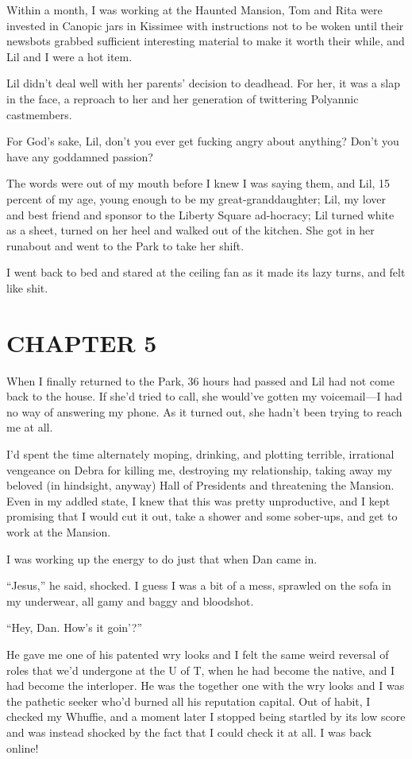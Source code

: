 Within a month, I was working at the Haunted Mansion, Tom and Rita
were invested in Canopic jars in Kissimee with instructions not to
be woken until their newsbots grabbed sufficient interesting
material to make it worth their while, and Lil and I were a hot
item.

Lil didn't deal well with her parents' decision to deadhead. For
her, it was a slap in the face, a reproach to her and her
generation of twittering Polyannic castmembers.

For God's sake, Lil, don't you ever get fucking angry about
anything? Don't you have any goddamned passion?

The words were out of my mouth before I knew I was saying them, and
Lil, 15 percent of my age, young enough to be my
great-granddaughter; Lil, my lover and best friend and sponsor to
the Liberty Square ad-hocracy; Lil turned white as a sheet, turned
on her heel and walked out of the kitchen. She got in her runabout
and went to the Park to take her shift.

I went back to bed and stared at the ceiling fan as it made its
lazy turns, and felt like shit.

\section{CHAPTER 5}

When I finally returned to the Park, 36 hours had passed and Lil
had not come back to the house. If she'd tried to call, she
would've gotten my voicemail—I had no way of answering my phone. As
it turned out, she hadn't been trying to reach me at all.

I'd spent the time alternately moping, drinking, and plotting
terrible, irrational vengeance on Debra for killing me, destroying
my relationship, taking away my beloved (in hindsight, anyway) Hall
of Presidents and threatening the Mansion. Even in my addled state,
I knew that this was pretty unproductive, and I kept promising that
I would cut it out, take a shower and some sober-ups, and get to
work at the Mansion.

I was working up the energy to do just that when Dan came in.

“Jesus,” he said, shocked. I guess I was a bit of a mess, sprawled
on the sofa in my underwear, all gamy and baggy and bloodshot.

“Hey, Dan. How's it goin'?”

He gave me one of his patented wry looks and I felt the same weird
reversal of roles that we'd undergone at the U of T, when he had
become the native, and I had become the interloper. He was the
together one with the wry looks and I was the pathetic seeker who'd
burned all his reputation capital. Out of habit, I checked my
Whuffie, and a moment later I stopped being startled by its low
score and was instead shocked by the fact that I could check it at
all. I was back online!

